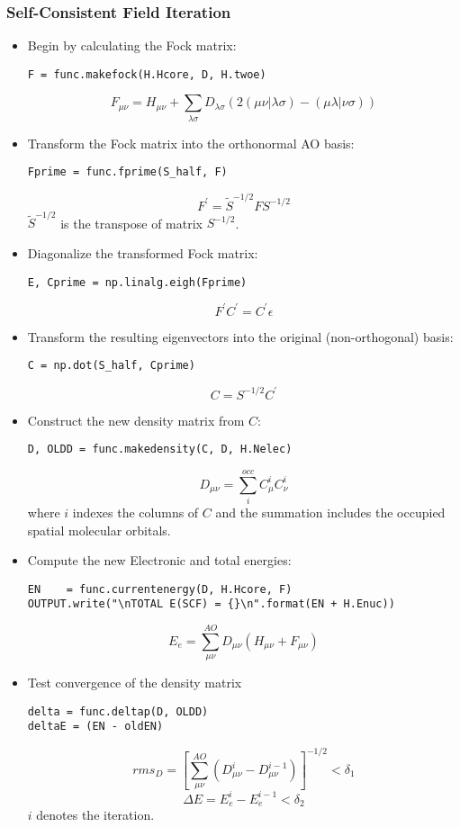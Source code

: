 \documentclass[a4paper]{article}
\begin{document}
\subsubsection{Self-Consistent Field Iteration}
\begin{itemize}
\item Begin by calculating the Fock matrix:
\begin{verbatim}
F = func.makefock(H.Hcore, D, H.twoe)
\end{verbatim}
$$
F_{\mu\nu} = H_{\mu\nu} + \sum_{\lambda\sigma} D_{\lambda\sigma} \left( 2 (\mu\nu |\lambda\sigma) - (\mu\lambda |\nu\sigma)\right)
$$

\item Transform the Fock matrix into the orthonormal AO basis:
\begin{verbatim}
Fprime = func.fprime(S_half, F)
\end{verbatim}
$$
F^' = \tilde{S}^{-1/2} F S^{-1/2}
$$
$\tilde{S}^{-1/2}$ is the transpose of matrix $S^{-1/2}$.

\item Diagonalize the transformed Fock matrix:
\begin{verbatim}
E, Cprime = np.linalg.eigh(Fprime)
\end{verbatim}
$$
F^' C^' = C^' \epsilon
$$

\item Transform the resulting eigenvectors into the original (non-orthogonal) basis:
\begin{verbatim}
C = np.dot(S_half, Cprime)
\end{verbatim}
$$
C = S^{-1/2} C^'
$$

\item Construct the new density matrix from $C$:
\begin{verbatim}
D, OLDD = func.makedensity(C, D, H.Nelec)
\end{verbatim}
$$
D_{\mu\nu} = \sum^{occ}_i C^{i}_{\mu} C^{i}_{\nu}
$$
where $i$ indexes the columns of $C$ and the summation includes the occupied spatial molecular orbitals.

\item Compute the new Electronic and total energies:
\begin{verbatim}
EN    = func.currentenergy(D, H.Hcore, F)
OUTPUT.write("\nTOTAL E(SCF) = {}\n".format(EN + H.Enuc))
\end{verbatim}
$$
E_e = \sum^{AO}_{\mu\nu} D_{\mu\nu} \left( H_{\mu\nu} + F_{\mu\nu} \right)
$$

\item Test convergence of the density matrix
\begin{verbatim}
delta = func.deltap(D, OLDD)
deltaE = (EN - oldEN)
\end{verbatim}
$$
rms_D = \left[ \sum^{AO}_{\mu\nu} \left( D^{i}_{\mu\nu} - D^{i-1}_{\mu\nu} \right) \right]^{-1/2} < \delta_1
$$
$$
\Delta E = E^{i}_{e} - E^{i-1}_{e} < \delta_2
$$
$i$ denotes the iteration.

\end{itemize}
\end{document}
